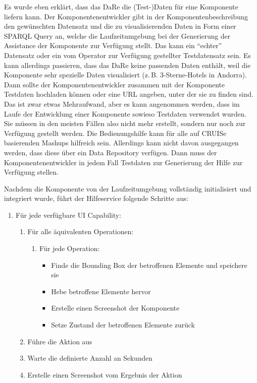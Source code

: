 \documentclass[
	headsepline,
	footsepline,
	fontsize=12pt,
	bibliography=totoc
]{scrbook}
\begin{document}
Es wurde eben erklärt, dass das DaRe die (Test-)Daten für eine Komponente liefern kann. Der Komponentenentwickler gibt in der Komponentenbeschreibung den gewünschten Datensatz und die zu visualisierenden Daten in Form einer SPARQL Query an, welche die Laufzeitumgebung bei der Generierung der Assistance der Komponente zur Verfügung stellt. Das kann ein \enquote{echter} Datensatz oder ein vom Operator zur Verfügung gestellter Testdatensatz sein. Es kann allerdings passieren, dass das DaRe keine passenden Daten enthält, weil die Komponente sehr spezielle Daten visualisiert (z.\,B. 3-Sterne-Hotels in Andorra). Dann sollte der Komponentenentwickler zusammen mit der Komponente Testdaten hochladen können oder eine URL angeben, unter der sie zu finden sind. Das ist zwar etwas Mehraufwand, aber es kann angenommen werden, dass im Laufe der Entwicklung einer Komponente sowieso Testdaten verwendet wurden. Sie müssen in den meisten Fällen also nicht mehr erstellt, sondern nur noch zur Verfügung gestellt werden. Die Bedienungshilfe kann für alle auf CRUISe basierenden Mashups hilfreich sein. Allerdings kann nicht davon ausgegangen werden, dass diese über ein Data Repository verfügen. Dann muss der Komponentenentwickler in jedem Fall Testdaten zur Generierung der Hilfe zur Verfügung stellen.

Nachdem die Komponente von der Laufzeitumgebung vollständig initialisiert und integriert wurde, führt der Hilfeservice folgende Schritte aus:

\begin{enumerate}
	\item Für jede verfügbare UI Capability:
	\begin{enumerate}
		\item Für alle äquivalenten Operationen:
		\begin{enumerate}
			\item Für jede Operation:
			\begin{itemize}
				\item Finde die Bounding Box der betroffenen Elemente und speichere sie
				\item Hebe betroffene Elemente hervor
				\item Erstelle einen Screenshot der Komponente
				\item Setze Zustand der betroffenen Elemente zurück
			\end{itemize}
		\end{enumerate}
		\item Führe die Aktion aus
		\item Warte die definierte Anzahl an Sekunden
		\item Erstelle einen Screenshot vom Ergebnis der Aktion
	\end{enumerate}
\end{enumerate}
\end{document}
